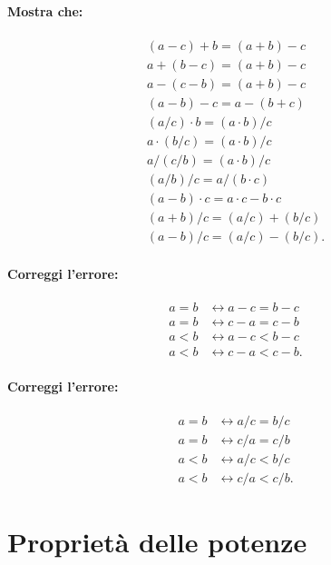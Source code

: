 \documentclass{article}
\begin{document}
\paragraph{Mostra che:}

\begin{align*}
(a - c) + b = (a + b) - c\\ 
a + (b - c) = (a + b) - c\\
a - (c - b) = (a + b) - c\\
(a - b) - c = a - (b + c)\\
(a / c) \cdot b = (a \cdot b) / c\\ 
a \cdot (b / c) = (a \cdot b) / c\\
a / (c / b) = (a \cdot b) / c\\
(a / b) / c = a / (b \cdot c)\\
(a - b) \cdot c = a \cdot c - b \cdot c\\
(a + b) / c = (a / c) + (b / c)\\
(a - b) / c = (a / c) - (b / c).
\end{align*}

\paragraph{Correggi l'errore:}

\begin{align*}
a = b &\longleftrightarrow a - c = b - c\\
a = b &\longleftrightarrow c - a = c - b\\
a < b &\longleftrightarrow a - c < b - c\\
a < b &\longleftrightarrow c - a < c - b.
\end{align*}

\paragraph{Correggi l'errore:}

\begin{align*}
a = b &\longleftrightarrow a / c = b / c\\
a = b &\longleftrightarrow c / a = c / b\\
a < b &\longleftrightarrow a / c < b / c\\
a < b &\longleftrightarrow c / a < c / b.
\end{align*}

\newpage
\section*{Proprietà delle potenze}
\end{document}
